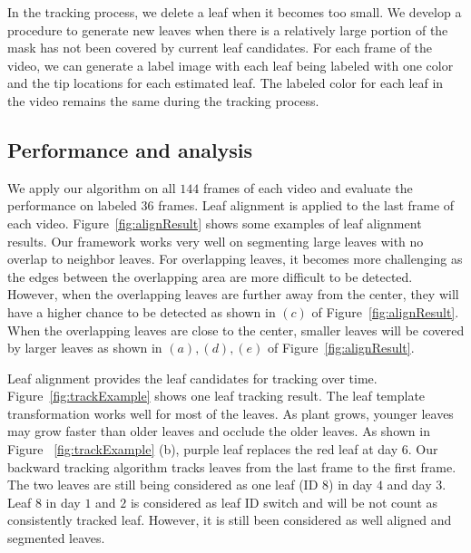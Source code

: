 In the tracking process, we delete a leaf when it becomes too small.
We develop a procedure to generate new leaves when there is a relatively large portion of the mask has not been covered by current leaf candidates.
For each frame of the video, we can generate a label image with each leaf being labeled with one color and the tip locations for each estimated leaf.
The labeled color for each leaf in the video remains the same during the tracking process.



\subsection{Performance and analysis}
We apply our algorithm on all $144$ frames of each video and evaluate the performance on labeled $36$ frames.
Leaf alignment is applied to the last frame of each video.
Figure~\ref{fig:alignResult} shows some examples of leaf alignment results.
Our framework works very well on segmenting large leaves with no overlap to neighbor leaves.
For overlapping leaves, it becomes more challenging as the edges between the overlapping area are more difficult to be detected.
However, when the overlapping leaves are further away from the center, they will have a higher chance to be detected as shown in $(c)$ of Figure~\ref{fig:alignResult}.
When the overlapping leaves are close to the center, smaller leaves will be covered by larger leaves as shown in $(a), (d), (e)$ of Figure~\ref{fig:alignResult}.


Leaf alignment provides the leaf candidates for tracking over time.
Figure~\ref{fig:trackExample} shows one leaf tracking result.
The leaf template transformation works well for most of the leaves.
As plant grows, younger leaves may grow faster than older leaves and occlude the older leaves.
As shown in Figure ~\ref{fig:trackExample} (b), purple leaf replaces the red leaf at day $6$.
Our backward tracking algorithm tracks leaves from the last frame to the first frame.
The two leaves are still being considered as one leaf (ID $8$) in day $4$ and day $3$.
Leaf $8$ in day $1$ and $2$ is considered as leaf ID switch and will be not count as consistently tracked leaf.
However, it is still been considered as well aligned and segmented leaves.

